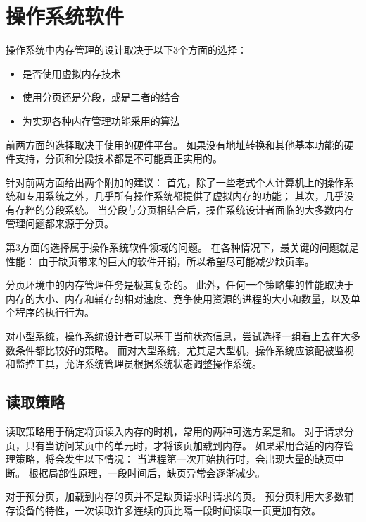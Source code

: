 
\section{操作系统软件}
{
    操作系统中内存管理的设计取决于以下3个方面的选择：

    \begin{itemize}
        \item 是否使用虚拟内存技术
        \item 使用分页还是分段，或是二者的结合
        \item 为实现各种内存管理功能采用的算法
    \end{itemize}

    前两方面的选择取决于使用的硬件平台。
    如果没有地址转换和其他基本功能的硬件支持，分页和分段技术都是不可能真正实用的。

    针对前两方面给出两个附加的建议：
    首先，除了一些老式个人计算机上的操作系统和专用系统之外，几乎所有操作系统都提供了虚拟内存的功能；
    其次，几乎没有存粹的分段系统。
    当分段与分页相结合后，操作系统设计者面临的大多数内存管理问题都来源于分页。

    第3方面的选择属于操作系统软件领域的问题。
    在各种情况下，最关键的问题就是性能：
    由于缺页带来的巨大的软件开销，所以希望尽可能减少缺页率。

    分页环境中的内存管理任务是极其复杂的。
    此外，任何一个策略集的性能取决于内存的大小、内存和辅存的相对速度、竞争使用资源的进程的大小和数量，以及单个程序的执行行为。

    对小型系统，操作系统设计者可以基于当前状态信息，尝试选择一组看上去在大多数条件都比较好的策略。
    而对大型系统，尤其是大型机，操作系统应该配被监视和监控工具，允许系统管理员根据系统状态调整操作系统。

    \subsection{读取策略}
    {
        读取策略用于确定将页读入内存的时机，常用的两种可选方案是和。
        对于请求分页，只有当访问某页中的单元时，才将该页加载到内存。
        如果采用合适的内存管理策略，将会发生以下情况：
        当进程第一次开始执行时，会出现大量的缺页中断。
        根据局部性原理，一段时间后，缺页异常会逐渐减少。

        对于预分页，加载到内存的页并不是缺页请求时请求的页。
        预分页利用大多数辅存设备的特性，一次读取许多连续的页比隔一段时间读取一页更加有效。
    }

}
